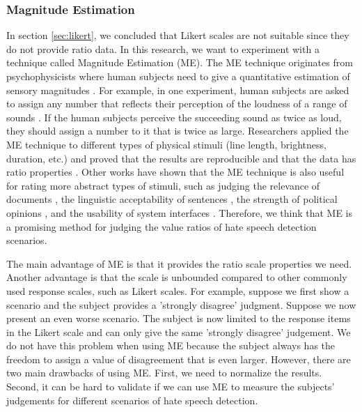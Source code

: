 \subsubsection{Magnitude Estimation}
\label{sec:me}
In section \ref{sec:likert}, we concluded that Likert scales are not suitable since they do not provide ratio data.
%
In this research, we want to experiment with a technique called Magnitude Estimation (ME).
%
The ME technique originates from psychophysicists where human subjects need to give a quantitative estimation of sensory magnitudes \cite{stevens1956direct}.
%
For example, in one experiment, human subjects are asked to assign any number that reflects their perception of the loudness of a range of sounds \cite{stevens1956direct}.
%
If the human subjects perceive the succeeding sound as twice as loud, they should assign a number to it that is twice as large.
%
Researchers applied the ME technique to different types of physical stimuli (line length, brightness, duration, etc.) and proved that the results are reproducible and that the data has ratio properties \cite{moskowitz1977magnitude}.
%
Other works have shown that the ME technique is also useful for rating more abstract types of stimuli, such as judging the relevance of documents \cite{maddalena2017crowdsourcing}, the linguistic acceptability of sentences \cite{bard1996magnitude}, the strength of political opinions \cite{lodge1979comparisons, lodge1976calibration}, and the usability of system interfaces \cite{mcgee2004master}.
%
Therefore, we think that ME is a promising method for judging the value ratios of hate speech detection scenarios.
%

%
The main advantage of ME is that it provides the ratio scale properties we need.
%
Another advantage is that the scale is unbounded compared to other commonly used response scales, such as Likert scales.
%
For example, suppose we first show a scenario and the subject provides a 'strongly disagree' judgment.
%
Suppose we now present an even worse scenario.
%
The subject is now limited to the response items in the Likert scale and can only give the same 'strongly disagree' judgement.
%
We do not have this problem when using ME because the subject always has the freedom to assign a value of disagreement that is even larger.
%
However, there are two main drawbacks of using ME.
%
First, we need to normalize the results.
%
Second, it can be hard to validate if we can use ME to measure the subjects' judgements for different scenarios of hate speech detection.
%

